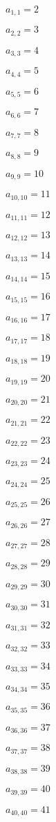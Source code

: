 \documentclass[a4paper,12pt]{article}
\begin{document}
$a _{ 1, 1 } = 2$

$a _{ 2, 2 } = 3$

$a _{ 3, 3 } = 4$

$a _{ 4, 4 } = 5$

$a _{ 5, 5 } = 6$

$a _{ 6, 6 } = 7$

$a _{ 7, 7 } = 8$

$a _{ 8, 8 } = 9$

$a _{ 9, 9 } = 10$

$a _{ 10, 10 } = 11$

$a _{ 11, 11 } = 12$

$a _{ 12, 12 } = 13$

$a _{ 13, 13 } = 14$

$a _{ 14, 14 } = 15$

$a _{ 15, 15 } = 16$

$a _{ 16, 16 } = 17$

$a _{ 17, 17 } = 18$

$a _{ 18, 18 } = 19$

$a _{ 19, 19 } = 20$

$a _{ 20, 20 } = 21$

$a _{ 21, 21 } = 22$

$a _{ 22, 22 } = 23$

$a _{ 23, 23 } = 24$

$a _{ 24, 24 } = 25$

$a _{ 25, 25 } = 26$

$a _{ 26, 26 } = 27$

$a _{ 27, 27 } = 28$

$a _{ 28, 28 } = 29$

$a _{ 29, 29 } = 30$

$a _{ 30, 30 } = 31$

$a _{ 31, 31 } = 32$

$a _{ 32, 32 } = 33$

$a _{ 33, 33 } = 34$

$a _{ 34, 34 } = 35$

$a _{ 35, 35 } = 36$

$a _{ 36, 36 } = 37$

$a _{ 37, 37 } = 38$

$a _{ 38, 38 } = 39$

$a _{ 39, 39 } = 40$

$a _{ 40, 40 } = 41$
\end{document}

